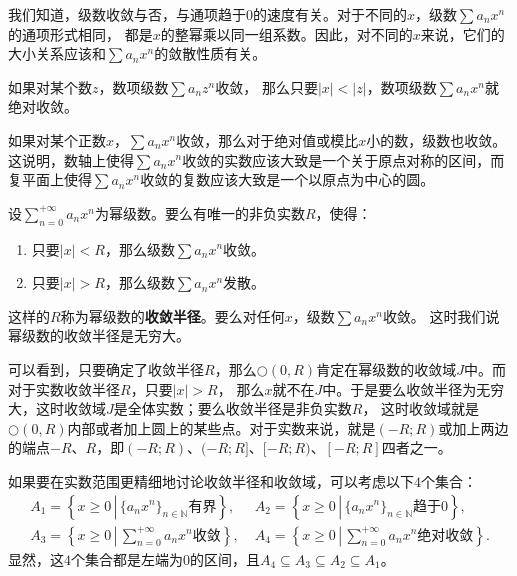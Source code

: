 \documentclass[12pt,UTF8]{ctexbook}
\begin{document}
\begin{appendix}
我们知道，级数收敛与否，与通项趋于$0$的速度有关。对于不同的$x$，级数$\sum a_n x^n$的通项形式相同，
都是$x$的整幂乘以同一组系数。因此，对不同的$x$来说，它们的大小关系应该和$\sum a_n x^n$的敛散性质有关。

\begin{tm}\label{tm:a-1-0}
    如果对某个数$z$，数项级数$\sum a_n z^n$收敛，
    那么只要$|x|<|z|$，数项级数$\sum a_n x^n$就绝对收敛。
\end{tm}

如果对某个正数$x$，$\sum a_n x^n$收敛，那么对于绝对值或模比$x$小的数，级数也收敛。
这说明，数轴上使得$\sum a_n x^n$收敛的实数应该大致是一个关于原点对称的区间，而复平面上使得$\sum a_n x^n$收敛的复数应该大致是一个以原点为中心的圆。

\begin{tm}\label{tm:a-1-10}
    设$\displaystyle\sum_{n=0}^{+\infty} a_n x^n$为幂级数。要么有唯一的非负实数$R$，使得：
    \begin{enumerate}
        \item 只要$|x|<R$，那么级数$\sum a_n x^n$收敛。
        \item 只要$|x|>R$，那么级数$\sum a_n x^n$发散。
    \end{enumerate}
    这样的$R$称为幂级数的\textbf{收敛半径}。要么对任何$x$，级数$\sum a_n x^n$收敛。
    这时我们说幂级数的收敛半径是无穷大。
\end{tm}

可以看到，只要确定了收敛半径$R$，那么$\bigcirc(0,R)$肯定在幂级数的收敛域$J$中。而对于实数收敛半径$R$，只要$|x|>R$，
那么$x$就不在$J$中。于是要么收敛半径为无穷大，这时收敛域$J$是全体实数；要么收敛半径是非负实数$R$，
这时收敛域就是$\bigcirc(0,R)$内部或者加上圆上的某些点。对于实数来说，就是$(-R;R)$或加上两边的端点$-R$、$R$，即$(-R;R)$、$(-R;R]$、$[-R;R)$、$[-R;R]$四者之一。

如果要在实数范围更精细地讨论收敛半径和收敛域，可以考虑以下$4$个集合：
\begin{align*}
    A_1 = \left\{ x \geqslant 0 \, \left| \, \{a_n x^n\}_{n\in\mathbb{N}}\mbox{有界} \right. \right\}, &\; A_2 = \left\{ x \geqslant 0 \, \left| \, \{a_n x^n\}_{n\in\mathbb{N}}\mbox{趋于}0 \right. \right\}, \\[4pt]
    A_3 = \left\{ x \geqslant 0 \, \left| \, \sum_{n=0}^{+\infty} a_n x^n \mbox{收敛} \right. \right\}, &\; A_4 =  \left\{ x \geqslant 0 \, \left| \, \sum_{n=0}^{+\infty} a_n x^n \mbox{绝对收敛} \right. \right\}.
\end{align*}
显然，这$4$个集合都是左端为$0$的区间，且$A_4\subseteq A_3 \subseteq A_2\subseteq A_1$。


\end{appendix}
\end{document}
